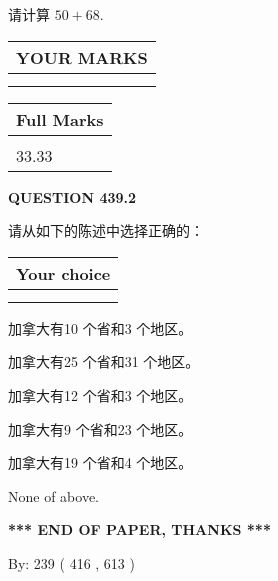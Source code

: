 \documentclass{ctexart}
\begin{document}
  
 
请计算 $ %
50 +  %
68 $.
 

 

 
  
\vspace{0.2in}
  
\noindent\begin{tabular}{|l|}
\hline
 YOUR MARKS  \\
\hline
 \\ 
 \\ 
\hline
\end{tabular}
\hspace{0.05in} \begin{tabular}{|l|}
\hline
 Full Marks  \\
\hline
 \\ 
33.33 \\
\hline
\end{tabular}
{\textbf{\Large{QUESTION
439.2 
}}}
  
  
请从如下的陈述中选择正确的：
  
  
\noindent\hspace{3.0in} \begin{tabular}{|l|}
\hline
Your choice \\
\hline
 \\ 
 \\ 
\hline
\end{tabular}
  
  
 
 
加拿大有10 个省和3 个地区。
 
 
加拿大有25 个省和31 个地区。
 
 
加拿大有12 个省和3 个地区。
 
 
加拿大有9 个省和23 个地区。
 
 
加拿大有19 个省和4 个地区。
 
 
 None of above.
 
 
   
   
 \vspace{0.2in}
 
   
   
   
   
\vspace{1.0in} 
{\textbf{\large{ *** END OF PAPER, THANKS *** }}} 
   
   
\hspace{1.0in} By: 
 239 ( 416 ,  613 )
   
\end{document}
